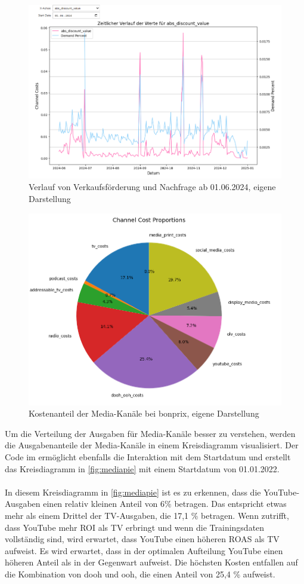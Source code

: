 \begin{figure}
    \centering
    \includegraphics[width=0.75\linewidth]{images/vf_sum.png}
    \caption{Verlauf von Verkaufsförderung und Nachfrage ab 01.06.2024, eigene Darstellung}
    \label{fig:verlaufvonverkaufsförderung}
\end{figure}
\begin{figure}[ht]
    \centering
    \includegraphics[width=0.8\linewidth]{images/mediapie.png}
    \caption{Kostenanteil der Media-Kanäle bei bonprix, eigene Darstellung}
    \label{fig:mediapie}
\end{figure}
Um die Verteilung der Ausgaben für Media-Kanäle besser zu verstehen, werden die Ausgabenanteile der Media-Kanäle in einem Kreisdiagramm visualisiert. Der Code im  ermöglicht ebenfalls die Interaktion mit dem Startdatum und erstellt das Kreisdiagramm in \autoref{fig:mediapie} mit einem Startdatum von 01.01.2022.\\\\
In diesem Kreisdiagramm in \autoref{fig:mediapie} ist es zu erkennen, dass die YouTube-Ausgaben einen relativ kleinen Anteil von 6\% betragen. Das entspricht etwas mehr als einem Drittel der TV-Ausgaben, die 17,1 \% betragen. Wenn  zutrifft, dass YouTube mehr \ac{ROI} als TV erbringt und wenn die Trainingsdaten vollständig sind, wird erwartet, dass YouTube einen höheren \ac{ROAS} als TV aufweist. Es wird erwartet, dass in der optimalen Aufteilung YouTube einen höheren Anteil als in der Gegenwart aufweist. Die höchsten Kosten entfallen auf die Kombination von \ac{dooh} und \ac{ooh}, die einen Anteil von 25,4 \% aufweist.
\newpage
